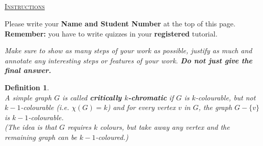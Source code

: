 \documentclass[twoside]{article}
\theoremstyle{mystyle}
\newtheorem{defn}{Definition}
\begin{document}
\begin{center}
\section*{}
\vspace{0.1in}
\large \underline{\textsc{Instructions}}
\vspace{0.1in}
\normalsize

Please write your \textbf{Name and Student Number} at the top of this page.\\

\textbf{Remember:} you have to write quizzes in your \textbf{registered} tutorial.
\vspace{0.1in}
\end{center}


\begin{center}
\textit{Make sure to show as many steps of your work as possible, justify as much and annotate any interesting steps or features of your work.  \textbf{Do not just give the final answer.}} \\
\end{center}
        
\begin{defn}\mbox{}\\

\noindent A simple graph $G$ is called \textbf{critically $k$-chromatic} if $G$ is $k$-colourable, but not $k-1$-colourable (i.e. $\chi(G) = k$) and for every vertex $v$ in $G$, the graph $G-\{v\}$ is $k-1$-colourable.\\

\noindent \textit{(The idea is that $G$ requires $k$ colours, but take away any vertex and the remaining graph can be $k-1$-coloured.)}
\end{defn}
\end{document}
